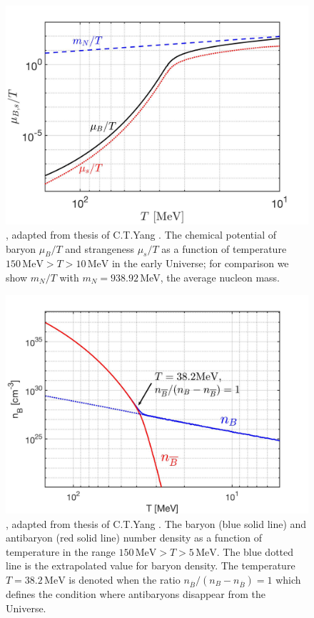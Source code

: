 \begin{figure}[t]
\centering
\includegraphics[width=\textwidth]{./plots/New_Chemical_Potential_C.jpg}
\caption{, adapted from thesis of C.T.Yang \cite{Yang:2024ret}. The chemical potential of baryon $\mu_B/T$ and strangeness $\mu_s/T$ as a function of temperature $150\,\mathrm{MeV}> T>10\,\mathrm{MeV}$ in the early Universe; for comparison we show $m_N/T $ with $m_N=938.92$\,MeV, the average nucleon mass.}
\label{ChemPotFig}
\end{figure}
\begin{figure}[h]
\centering
\includegraphics[width=\textwidth]{./plots/Baryon_Antibaryon_cm.jpg}
\caption{, adapted from thesis of C.T.Yang \cite{Yang:2024ret}. The baryon (blue solid line) and antibaryon (red solid line) number density as a function of temperature in the range $150\,\mathrm{MeV}>T>5\,\mathrm{MeV}$. The blue dotted line is the extrapolated value for baryon density. The temperature $T=38.2\,\mathrm{MeV}$ is denoted when the ratio $n_{\overline B}/(n_B-n_{\overline B})=1$ which defines the condition where antibaryons disappear from the Universe.}
\label{Baryon_fig}
\end{figure}
